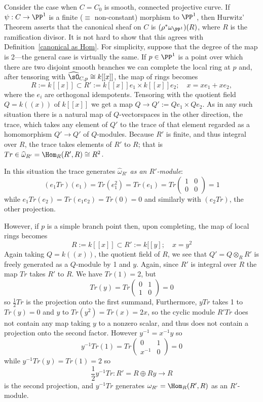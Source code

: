 \begin{example}
Consider the case when $C = C_0$ is smooth, connected projective curve. If $\psi: C\to \PP^1$ is a finite  ($\equiv$ non-constant) morphism to $\PP^1$, then Hurwitz' Theorem asserts that the canonical sheaf on
$C$ is $(\rho^*\omega_{\PP^1})(R)$, where $R$ is the ramification divisor. It is not hard to show that this
agrees with Definition~\ref{canonical as Hom}. For simplicity, suppose that the degree of the map is 2---the general case
is virtually the same. If
 $ p\in\PP^1$ is a point over which there are two disjoint smooth branches
we can complete the local ring at $p$ and, after tensoring
with $\widehat \sO_{C,p} \cong k[[x]]$, the map of rings becomes 
$$
R := k[[x]] \subset R':= k[[x]]e_1\times k[[x]]e_2; \quad x =xe_1+xe_2,
$$
where the $e_i$ are orthogonal idempotents. Tensoring with the quotient field $Q = k((x))$ of $k[[x]]$
we get a map $Q \to Q':= Qe_1\times Qe_2$. As in any such situation there is a natural map of $Q$-vectorspaces in the other direction, the trace, which takes any element of $Q'$ to the trace of that element
regarded as a homomorphism $Q' \to Q'$ of $Q$-modules. Because $R'$ is finite, and thus integral over $R$, the trace takes elements of $R'$ to $R$; that is $Tr \in \widehat \omega_{R'} = \Hom_R(R', R) \cong R^2$.

In this situation the trace generates $\widehat \omega_{R'}$ \emph{as an $R'$-module}: 
$$
(e_1Tr) (e_1) = Tr(e_1^2) = Tr(e_1) = Tr 
\begin{pmatrix}
 1&0\\0&0
\end{pmatrix} 
=1$$
while $e_1Tr(e_2) = Tr(e_1e_2) = Tr(0) = 0$
and similarly with $(e_2Tr)$, the other projection.

However, if $p$ is a simple branch point then, upon completing, the map of local rings becomes
$$
R := k[[x]] \subset R':= k[[y]; \quad x = y^2
$$
Again taking $Q = k((x))$, the quotient field of $R$, we see that $Q' = Q\otimes_RR'$ is freely generated as a $Q$-module by 1 and $y$. Again, since $R'$ is integral over $R$ the map $Tr$ takes $R'$ to $R$.
We have $Tr(1) = 2$,  but
$$
Tr(y) = Tr
\begin{pmatrix}
 0&1\\1&0
\end{pmatrix} 
=0
$$
so $\frac{1}{2}Tr$ is the projection onto the first summand,
Furthermore, $yTr$ takes 1 to $Tr(y) =0$ and $y$ to $Tr(y^2) = Tr(x) = 2x$,
so the cyclic module $R'Tr$ does not contain any map taking $y$ to a nonzero scalar, and
thus does not contain a projection onto the second factor.
However $y^{-1}= x^{-1}y$ so
$$
y^{-1}Tr(1) = 
Tr
\begin{pmatrix}
0&1\\ x^{-1}&0
\end{pmatrix} 
=0
$$
while
$
y^{-1}Tr(y) = Tr(1) = 2
$
so 
$$
\frac{1}{2}y^{-1}Tr: R' = R\oplus Ry \to R
$$
 is the second projection, and $y^{-1}Tr$ generates $\omega_{R'} = \Hom_R(R', R)$ as an $R'$-module.


\end{example}
